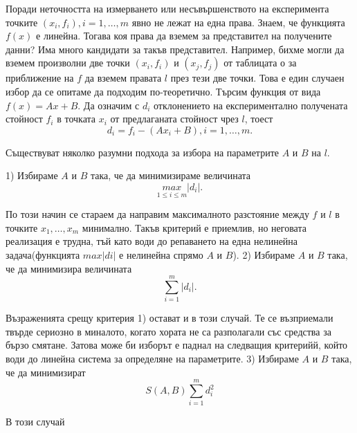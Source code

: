 \documentclass[12pt]{article}
\numberwithin{equation}{section}
\numberwithin{theorem}{section}
\numberwithin{definition}{section}
\numberwithin{corollary}{section}
\begin{document}
\par
Поради неточността на измерването или несъвършенството на експеримента точките $(x_i,f_i), i=1,\dotso,m$ явно не лежат на една права. Знаем, че функцията $f(x)$ е линейна. Тогава коя права да вземем за представител на получените данни? Има много кандидати за такъв представител. Например, бихме могли да вземем произволни две точки $(x_i, f_i)$ и $(x_j, f_j)$ от таблицата о за приближение на $f$ да вземем правата $l$ през тези две точки. Това е един случаен избор да се опитаме да подходим по-теоретично. Търсим функция от вида $f(x) = Ax+B$. Да означим с $d_i$ отклонението на експериментално получената стойност $f_i$ в точката $x_i$ от предлаганата стойност чрез $l$, тоест
\[
d_i = f_i - (Ax_i + B), i=1,\dotso,m.
\]
\par
Съществуват няколко разумни подхода за избора на параметрите $A$ и $B$ на $l$.
\par
1) Избираме $A$ и $B$ така, че да минимизираме величината
\[
\underset{1\leq i \leq m}{max}|d_i|.
\]
\par
По този начин се стараем да направим максималното разстояние между $f$ и $l$ в точките $x_1,\dotso, x_m$ минимално. Такъв критерий е приемлив, но неговата реализация е трудна, тъй като води до репаването на една нелинейна задача(функцията $max|di|$ е нелинейна спрямо $A$ и $B$).
2) Избираме $A$ и $B$ така, че да минимизира величината 
\[
\displaystyle\sum_{i=1}^m|d_i|.
\]
\par
Възраженията срещу критерия 1) остават и в този случай. Те се възприемали твърде сериозно в миналото, когато хората не са разполагали със средства за бързо смятане. Затова може би изборът е паднал на следващия критерийй, който води до линейна система за определяне на параметрите.
3) Избираме $A$ и $B$ така, че да минимизират 
\[
S(A,B)  \displaystyle\sum_{i=1}^md_i^2
\]
\par
В този случай 
\end{document}
